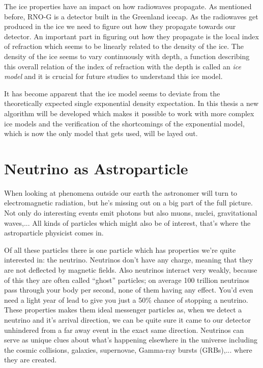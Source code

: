\documentclass[11pt,a4paper,faculty=we,language=en,doctype=report]{cls/ugent-doc}
\begin{document}
The ice properties have an impact on how radiowaves propagate. As mentioned before, RNO-G is a detector built
in the Greenland icecap. As the radiowaves get produced in the ice we need to figure out how
they propagate towards our detector. An important part in figuring out how they propagate is 
the local index of refraction which seems to be linearly related to the density of the ice. 
The density of the ice seems to vary continuously with depth, a function describing
this overall relation of the index of refraction with the depth is called an \textit{ice model}
and it is crucial for future studies to understand this ice model.

It has become apparent that the ice model seems to deviate from the
theoretically expected single exponential density expectation.  In this thesis
a new algorithm will be developed which makes it possible to work with more
complex ice models and the verification of the shortcomings of the exponential
model, which is now the only model that gets used, will be layed out.


\chapter{Neutrino as Astroparticle}
When looking at phenomena outside our earth the astronomer will turn to
electromagnetic radiation, but he's missing out on a big part of the full
picture. Not only do interesting events emit photons but also muons, nuclei,
gravitational waves,... All kinds of particles which might also be of interest,
that's where the astroparticle physicist comes in.

Of all these particles there is one particle which has properties we're quite
interested in: the neutrino.  Neutrinos don't have any charge, meaning that
they are not deflected by magnetic fields. Also neutrinos interact very weakly,
because of this they are often called “ghost” particles; on average 100
trillion neutrinos pass through your body per second, none of them having any
effect.  You'd even need a light year of lead to give you just a 50\% chance of
stopping a neutrino.
These properties makes them ideal messenger particles as, when we detect a neutrino
and it's arrival direction, we can be quite sure it came to our detector unhindered
from a far away event in the exact same direction.
Neutrinos can serve as unique clues
about what’s happening elsewhere in the universe including the cosmic
collisions, galaxies, supernovae, Gamma-ray bursts (GRBs),... where they are created.
\end{document}
